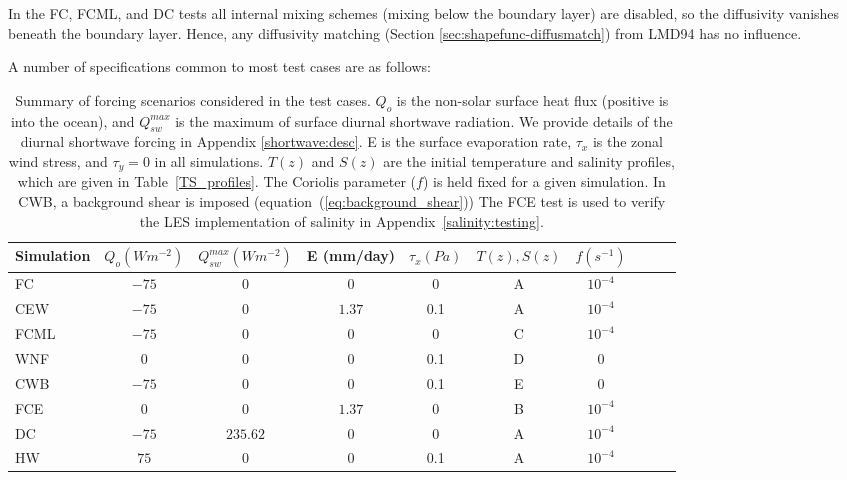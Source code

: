 \documentclass[preprint,12pt,authoryear]{agujournal}
\begin{document}
In the FC, FCML, and DC tests all internal mixing schemes (mixing below the boundary layer) are disabled, so the diffusivity vanishes beneath the boundary layer. Hence, any diffusivity  matching (Section \ref{sec:shapefunc-diffusmatch}) from LMD94 has no influence.   

A number of specifications common to most test cases are as follows:

\begin{sidewaystable}
	\def\arraystretch{1.5}
	\centering
	\begin{tabular}{ l  c  c  c  c  c  c  c  c  c }
		\hline
		Simulation & $ Q_o (W m^{-2}) $ & $Q_{sw}^{max} (W m^{-2}) $ & E (mm/day)& $\tau_x (Pa) $ &  $T(z), S(z)$ & $f (s^{-1})$ \\
		\hline
		FC & $ -75 $ &  0 & 0 & 0  & A & $10^{-4}$\\
		CEW & $-75$ &  0 & $1.37$ & 0.1 & A & $10^{-4}$\\
        FCML & $-75$ &  0 & 0 & 0 & C & $10^{-4}$\\
		WNF & $ 0 $ &  0 & $0$ & 0.1 & D & 0\\
		CWB & $-75$ &  0 & $0$ & 0.1 & E & 0 \\
		FCE & 0 &  0 & $1.37$ & 0 & B & $10^{-4}$ \\
		DC & $-75$ & $235.62$ & 0 & 0 & A & $10^{-4}$\\
        HW & $75$ & 0 & 0 & 0.1 & A & $10^{-4}$ \\
		\hline
	\end{tabular}
	\caption{Summary of forcing scenarios considered in the test cases. $Q_o$ is the non-solar surface heat flux (positive is into the ocean), and $Q_{sw}^{max}$ is the maximum of surface diurnal shortwave radiation. We provide details of the diurnal shortwave forcing in Appendix \ref{shortwave:desc}. E is the surface evaporation rate, $\tau_x$ is the zonal wind stress, and $\tau_y = 0$ in all simulations. $T(z)$ and $S(z)$ are the initial temperature and salinity profiles, which are given in Table~\ref{TS_profiles}. The Coriolis parameter ($f$) is held fixed for a given simulation. In CWB, a background shear is imposed (equation~(\ref{eq:background_shear})) The FCE test is used to verify the LES implementation of salinity in Appendix~\ref{salinity:testing}.} 
\label{exp_params}
\end{sidewaystable}
\end{document}

